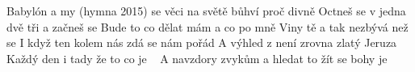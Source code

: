 \begin{TEXT}{Babylón a my (hymna 2015)}
\SLOKA* {} se věci na světě bůhví proč divně \NL
Octneš se v  jedna dvě tři a začneš se \NL
Bude to  co dělat mám a co po mně \NL
Viny tě  a tak nezbývá než se \NL
I když ten  kolem nás zdá se nám pořád \NL
A výhled z  není zrovna zlatý Jeruza\NL
Každý den  i tady že  to co je \,\,\,\NL
A navzdory  zvykům a  hledat to \NL
\SLOKA* {}   \NL
{}  žít se \NL
{}   bohy \NL
{}  je 
\end{TEXT}

